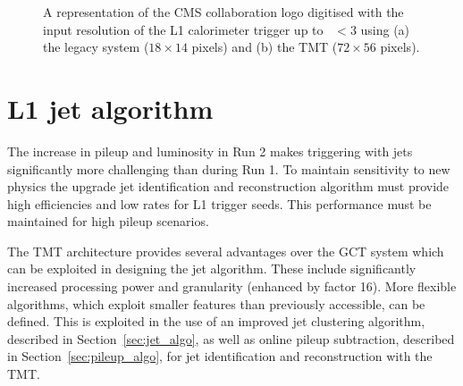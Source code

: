 \begin{figure}
\centering
{} \quad
{} 
\caption{A representation of the CMS collaboration logo digitised with the input resolution of the L1 calorimeter trigger up to 
\etaabs~$< 3$ using (a) the legacy system ($18 \times 14$ pixels) and (b) the TMT ($72 \times 56$ pixels).}
\label{fig:inputres}
\end{figure}

\section{L1 jet algorithm}
\label{algo}

The increase in pileup and luminosity in Run 2 makes triggering with jets
significantly more challenging than during Run 1. To maintain sensitivity to
new physics the upgrade jet identification and reconstruction 
algorithm must provide high efficiencies and low rates for L1 trigger seeds.
This performance must be maintained for high pileup scenarios.

The TMT architecture provides several advantages over the GCT system which can be 
exploited in designing the jet algorithm. These include significantly increased processing power
and granularity (enhanced by factor 16). More flexible algorithms, which 
exploit smaller features than previously accessible, can be defined. This is exploited in the 
use of an improved jet clustering algorithm, described in Section~\ref{sec:jet_algo}, as well as 
online pileup subtraction, described in Section~\ref{sec:pileup_algo}, for jet 
identification and reconstruction with the TMT.

